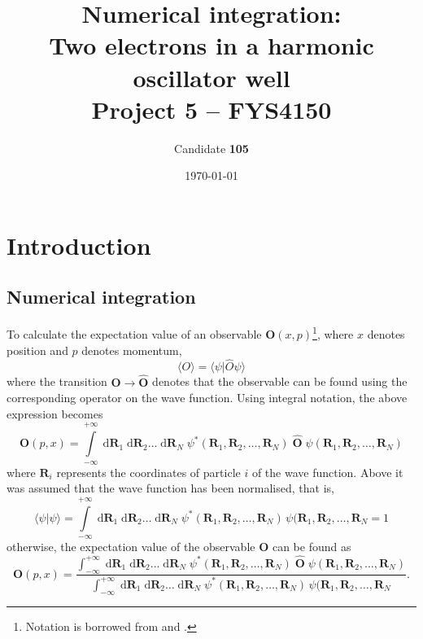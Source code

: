 \documentclass[a4paper,11pt]{article}
\date{\today}
\title{Numerical integration:\\ Two electrons in a harmonic oscillator well\\ \small{Project 5 -- FYS4150}}
\author{Candidate \textbf{105}}
\newcommand{\diff}{\ensuremath{\; \text{d}}}
\begin{document}
\onecolumn
\maketitle{}

\begin{abstract}
\end{abstract}

\section{Introduction}

\subsection{Numerical integration}
To calculate the expectation value of an observable $\mathbf{O}(x,p)$\footnote{Notation is borrowed from \cite{Griffiths:2005} and \cite{MHJ:2013}.}, where $x$ denotes position and $p$ denotes momentum,
\begin{equation}
    \langle O \rangle   =   \langle \psi | \hat{O} \psi \rangle
    \label{eq:observable}
\end{equation}
where the transition $\mathbf{O} \to \hat{\mathbf{O}}$ denotes that the observable can be found using the corresponding operator on the wave function. Using integral notation, the above expression becomes
\begin{equation}
    \mathbf{O}(p,x)   =   \int\limits_{-\infty}^{+\infty} \diff \mathbf{R}_1 \diff \mathbf{R}_2 \dots \diff \mathbf{R}_N \; \psi^*(\mathbf{R}_1, \mathbf{R}_2, \dots, \mathbf{R}_N ) \; \hat{\mathbf{O}} \; \psi(\mathbf{R}_1, \mathbf{R}_2, \dots, \mathbf{R}_N )
    \label{eq:observable_int1}
\end{equation}
where $\mathbf{R}_i$ represents the coordinates of particle $i$ of the wave function. Above it was assumed that the wave function has been normalised, that is,
\[ \langle \psi | \psi \rangle = \int\limits_{-\infty}^{+\infty}\! \diff \mathbf{R}_1 \diff \mathbf{R}_2 \dots \diff \mathbf{R}_N \; \psi^*(\mathbf{R}_1, \mathbf{R}_2, \dots, \mathbf{R}_N ) \, \psi(\mathbf{R}_1, \mathbf{R}_2, \dots, \mathbf{R}_N = 1 \]
otherwise, the expectation value of the observable $\mathbf{O}$ can be found as
\begin{equation}
    \mathbf{O}(p,x)   =   \frac{\int_{-\infty}^{+\infty} \diff \mathbf{R}_1 \diff \mathbf{R}_2 \dots \diff \mathbf{R}_N \; \psi^*(\mathbf{R}_1, \mathbf{R}_2, \dots, \mathbf{R}_N ) \; \hat{\mathbf{O}} \; \psi(\mathbf{R}_1, \mathbf{R}_2, \dots, \mathbf{R}_N ) }{ \int_{-\infty}^{+\infty} \diff \mathbf{R}_1 \diff \mathbf{R}_2 \dots \diff \mathbf{R}_N \; \psi^*(\mathbf{R}_1, \mathbf{R}_2, \dots, \mathbf{R}_N ) \, \psi(\mathbf{R}_1, \mathbf{R}_2, \dots, \mathbf{R}_N }.
    \label{eq:observable_final}
\end{equation}
\end{document}
